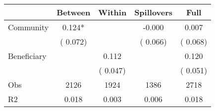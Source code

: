 
\begin{tabular}{l*{4}{c}}\hline&\multicolumn{1}{c}{Between}&\multicolumn{1}{c}{Within}&\multicolumn{1}{c}{Spillovers}&\multicolumn{1}{c}{Full}\\ \hline
 Community             &              0.124*      &                                               &       -0.000 &         0.007                            \\ 
                               &        (       0.072)           &                                       &       (       0.066)     &      (       0.068)                                           \\ 
 Beneficiary   &                                               &        0.112    &                                &             0.120                            \\ 
                               &                                               & (       0.047)                  &                                        &      (       0.051)                                           \\ 
\hline                                                                                                                                                                                                                                            
 Obs                   &               2126               &       1924                       &       1386                &              2718                                               \\ 
 R2                    &                      0.018              &              0.003                      &              0.006               &                     0.018                                              \\ 
\hline \end{tabular}                                                                                                                                                                                                              